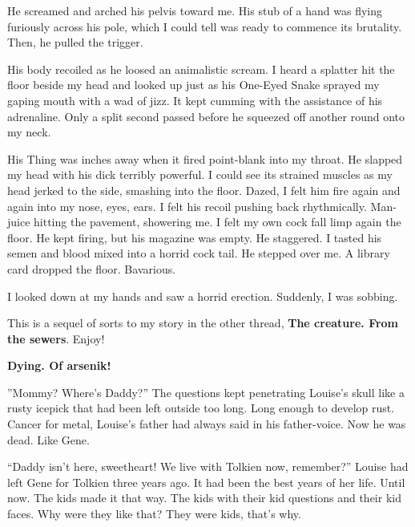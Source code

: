 He screamed and arched his pelvis toward me. His stub of a hand was
flying furiously across his pole, which I could tell was ready to
commence its brutality. Then, he pulled the trigger.



His body recoiled as he loosed an animalistic scream. I heard a
splatter hit the floor beside my head and looked up just as his
One-Eyed Snake sprayed my gaping mouth with a wad of jizz. It kept
cumming with the assistance of his adrenaline. Only a split second
passed before he squeezed off another round onto my neck.



His Thing was inches away when it fired point-blank into my throat.
He slapped my head with his dick terribly powerful. I could see its
strained muscles as my head jerked to the side, smashing into the
floor. Dazed, I felt him fire again and again into my nose, eyes,
ears. I felt his recoil pushing back rhythmically. Man-juice
hitting the pavement, showering me. I felt my own cock fall limp
again the floor. He kept firing, but his magazine was empty. He
staggered. I tasted his semen and blood mixed into a horrid cock
tail. He stepped over me. A library card dropped the floor.
Bavarious.



I looked down at my hands and saw a horrid erection. Suddenly, I
was sobbing. 
 





This is a sequel of sorts to my story in the other thread,
{\bf The creature. From the
sewers}. Enjoy!



{\bf Dying. Of arsenik!}



''Mommy? Where's Daddy?'' The questions kept
penetrating Louise's skull like a rusty icepick that had been
left outside too long. Long enough to develop rust. Cancer for
metal, Louise's father had always said in his father-voice. Now he
was dead. Like Gene.



``Daddy isn't here, sweetheart! We live with Tolkien now, remember?''
Louise had left Gene for Tolkien three years ago. It had been the
best years of her life. Until now. The kids made it that way. The
kids with their kid questions and their kid faces. Why were they
like that? They were kids, that's why.



